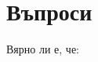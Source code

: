 \begin{problem}
\begin{enumerate}
  \end{enumerate}
\end{problem}

\section{Въпроси}
Вярно ли е, че:
